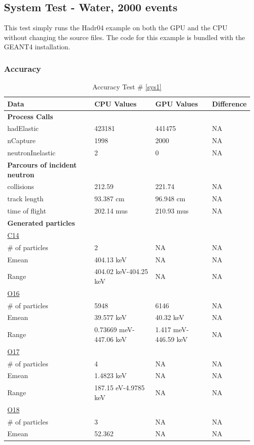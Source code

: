 \documentclass[12pt]{article}
\begin{document}
\subsection{System Test - Water, 2000 events}
This test simply runs the Hadr04 example on both the GPU and the CPU without changing the source files. The code for this example is bundled with the GEANT4 installation.\\
	\subsubsection{Accuracy}
		\begin{table}[!htbp]
		\centering
		\caption{Accuracy Test \# \ref{sys1}}\label{_acc}
		\begin{tabular}{llll}
		\toprule
		\bf Data & CPU Values & GPU Values & Difference\\\midrule
		\bf Process Calls&&&\\
		hadElastic&423181&441475&NA\\
		nCapture&1998&2000&NA\\
		neutronInelastic&2&0&NA\\ 
		\bf Parcours of incident neutron&&&\\
		collisions&212.59&221.74&NA\\
		track length&93.387 cm&96.948 cm&NA\\
		time of flight&202.14 mus&210.93 mus&NA\\
		\bf Generated particles&&&\\
		\underline{C14}&&&\\
		\# of particles&2&NA&NA\\
		Emean&404.13 keV&NA&NA\\
		Range&404.02 keV-404.25 keV&NA&NA\\
		\underline{O16}&&&\\
		\# of particles&5948&6146&NA\\
		Emean&39.577 keV&40.32 keV&NA\\
		Range&0.73669 meV-447.06 keV&1.417 meV-446.59 keV&NA\\
		\underline{O17}&&&\\
		\# of particles&4&NA&NA\\
		Emean&1.4823 keV&NA&NA\\
		Range&187.15 eV-4.9785 keV&NA&NA\\
		\underline{O18}&&&\\
		\# of particles&3&NA&NA\\
		Emean&52.362&NA&NA\\

\end{tabular}
\end{table}
\end{document}
